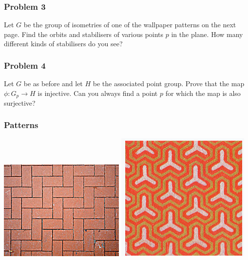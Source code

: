 \documentclass[11pt]{article}
\begin{document}
\subsubsection{Problem 3}
\label{sec:org8bde9f3}
Let \(G\) be the group of isometries of one of the wallpaper patterns on the next page.
Find the orbits and stabilisers of various points \(p\) in the plane.
How many different kinds of stabilisers do you see?

\subsubsection{Problem 4}
\label{sec:org5618f10}
Let \(G\) be as before and let \(H\) be the associated point group.
Prove that the map \(\phi \colon G_p \to H\) is injective.
Can you always find a point \(p\) for which the map is also surjective?

\newpage

\subsubsection{Patterns}
\label{sec:orgd1777fd}
\includegraphics[width=.4\textwidth]{assets/Lectures/2022-08-18_09-20-47_screenshot.png}
\hfill
\includegraphics[width=.4\textwidth]{assets/Lectures/2022-08-18_09-30-40_screenshot.png}

\bigskip
\end{document}
